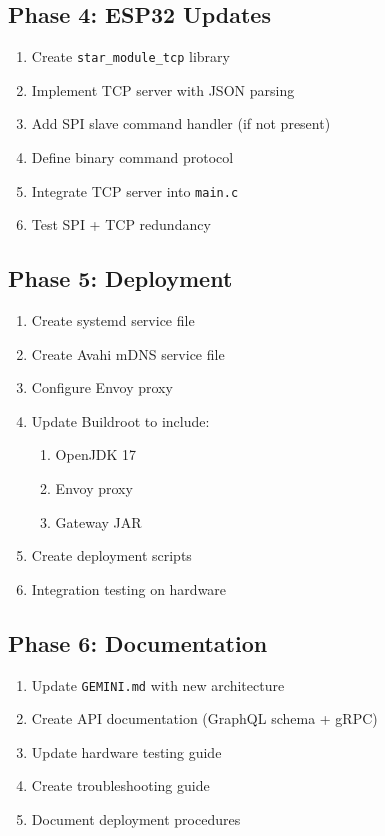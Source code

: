 \documentclass[11pt,letterpaper]{article}
\begin{document}
\subsection{Phase 4: ESP32 Updates}

\begin{enumerate}
    \item[$\square$] Create \texttt{star\_module\_tcp} library
    \item[$\square$] Implement TCP server with JSON parsing
    \item[$\square$] Add SPI slave command handler (if not present)
    \item[$\square$] Define binary command protocol
    \item[$\square$] Integrate TCP server into \texttt{main.c}
    \item[$\square$] Test SPI + TCP redundancy
\end{enumerate}

\subsection{Phase 5: Deployment}

\begin{enumerate}
    \item[$\square$] Create systemd service file
    \item[$\square$] Create Avahi mDNS service file
    \item[$\square$] Configure Envoy proxy
    \item[$\square$] Update Buildroot to include:
    \begin{enumerate}
        \item[$\square$] OpenJDK 17
        \item[$\square$] Envoy proxy
        \item[$\square$] Gateway JAR
    \end{enumerate}
    \item[$\square$] Create deployment scripts
    \item[$\square$] Integration testing on hardware
\end{enumerate}

\subsection{Phase 6: Documentation}

\begin{enumerate}
    \item[$\square$] Update \texttt{GEMINI.md} with new architecture
    \item[$\square$] Create API documentation (GraphQL schema + gRPC)
    \item[$\square$] Update hardware testing guide
    \item[$\square$] Create troubleshooting guide
    \item[$\square$] Document deployment procedures
\end{enumerate}
\end{document}
